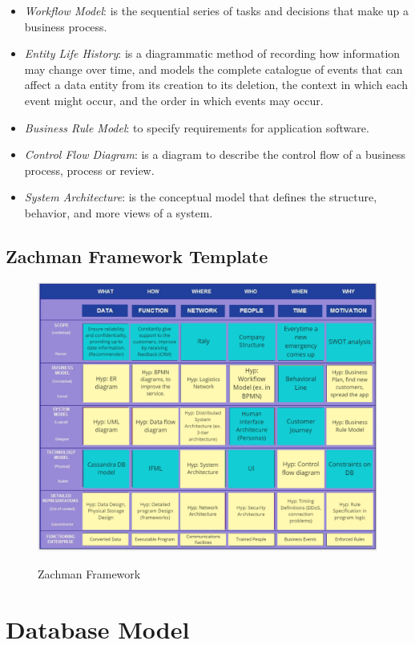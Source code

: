 \documentclass[../main.tex]{subfiles}
\begin{document}
\begin{itemize}
        \item \textit{Workflow Model}: is the sequential series of tasks and decisions that make up a business process.
        \item \textit{Entity Life History}: is a diagrammatic method of recording how information may change over time, and models the complete catalogue of events that can affect a data entity from its creation to its deletion, the context in which each event might occur, and the order in which events may occur.
        \item \textit{Business Rule Model}: to specify requirements for application software.
        \item \textit{Control Flow Diagram}: is a diagram to describe the control flow of a business process, process or review.
        \item \textit{System Architecture}: is the conceptual model that defines the structure, behavior, and more views of a system.
    \end{itemize}
    \subsection{Zachman Framework Template}
    \begin{figure}[H]
        \centering
        \includegraphics[scale = 0.5]{assets/zachman.png} \\
        \caption[]{Zachman Framework}\label{fig:figure12}
    \end{figure}
    
    \section{Database Model}
\end{document}

